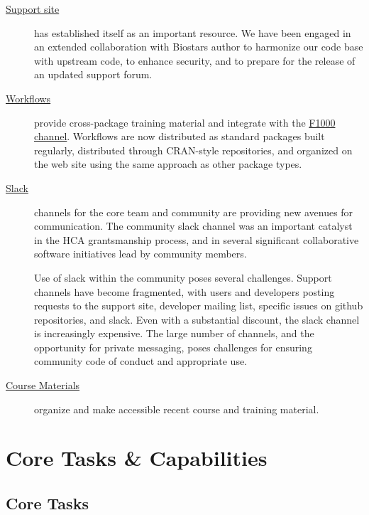 \documentclass[letterpaper]{article}
\begin{document}
\begin{description}
\item[\href{https://support.bioconductor.org}{Support site}] has
  established itself as an important resource. We have been engaged in
  an extended collaboration with Biostars author to harmonize our code
  base with upstream code, to enhance security, and to prepare for the
  release of an updated support forum.
\item[\href{https://bioconductor.org/help/workflows}{Workflows}]
  provide cross-package training material and integrate with the
  \href{http://f1000research.com/channels/bioconductor}{F1000
    \Bioconductor{} channel}. Workflows are now distributed as
  standard \R{} packages built regularly, distributed through
  CRAN-style repositories, and organized on the web site using the
  same approach as other package types.
\item[\href{https://community-bioc.slack.com}{Slack}] channels for the
  core team and \Bioconductor{} community are providing new avenues
  for communication. The community slack channel was an important
  catalyst in the HCA grantsmanship process, and in several
  significant collaborative software initiatives lead by community
  members.

  Use of slack within the community poses several challenges. Support
  channels have become fragmented, with users and developers posting
  requests to the support site, developer mailing list, specific
  issues on github repositories, and slack. Even with a substantial
  discount, the slack channel is increasingly expensive. The large
  number of channels, and the opportunity for private messaging, poses
  challenges for ensuring community code of conduct and appropriate
  use.
\item[\href{https://bioconductor.org/help/course-materials}{Course
    Materials}] organize and make accessible recent course and
  training material.
\end{description}

\section{Core Tasks \& Capabilities}

\subsection{Core Tasks}
\end{document}
